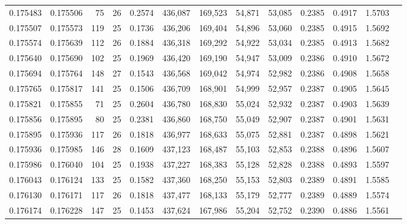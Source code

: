 \begin{tabular}{rrrrrrrrrrrrr}
0.175483 & 0.175506 &  75 &  26 &                                     0.2574 & 436,087 & 169,523 &  54,871 &  53,085 & 0.2385 & 0.4917 & 1.5703 \\
0.175507 & 0.175573 & 119 &  25 &                                     0.1736 & 436,206 & 169,404 &  54,896 &  53,060 & 0.2385 & 0.4915 & 1.5692 \\
0.175574 & 0.175639 & 112 &  26 &                                     0.1884 & 436,318 & 169,292 &  54,922 &  53,034 & 0.2385 & 0.4913 & 1.5682 \\
0.175640 & 0.175690 & 102 &  25 &                                     0.1969 & 436,420 & 169,190 &  54,947 &  53,009 & 0.2386 & 0.4910 & 1.5672 \\
0.175694 & 0.175764 & 148 &  27 &                                     0.1543 & 436,568 & 169,042 &  54,974 &  52,982 & 0.2386 & 0.4908 & 1.5658 \\
0.175765 & 0.175817 & 141 &  25 &                                     0.1506 & 436,709 & 168,901 &  54,999 &  52,957 & 0.2387 & 0.4905 & 1.5645 \\
0.175821 & 0.175855 &  71 &  25 &                                     0.2604 & 436,780 & 168,830 &  55,024 &  52,932 & 0.2387 & 0.4903 & 1.5639 \\
0.175856 & 0.175895 &  80 &  25 &                                     0.2381 & 436,860 & 168,750 &  55,049 &  52,907 & 0.2387 & 0.4901 & 1.5631 \\
0.175895 & 0.175936 & 117 &  26 &                                     0.1818 & 436,977 & 168,633 &  55,075 &  52,881 & 0.2387 & 0.4898 & 1.5621 \\
0.175936 & 0.175985 & 146 &  28 &                                     0.1609 & 437,123 & 168,487 &  55,103 &  52,853 & 0.2388 & 0.4896 & 1.5607 \\
0.175986 & 0.176040 & 104 &  25 &                                     0.1938 & 437,227 & 168,383 &  55,128 &  52,828 & 0.2388 & 0.4893 & 1.5597 \\
0.176043 & 0.176124 & 133 &  25 &                                     0.1582 & 437,360 & 168,250 &  55,153 &  52,803 & 0.2389 & 0.4891 & 1.5585 \\
0.176130 & 0.176171 & 117 &  26 &                                     0.1818 & 437,477 & 168,133 &  55,179 &  52,777 & 0.2389 & 0.4889 & 1.5574 \\
0.176174 & 0.176228 & 147 &  25 &                                     0.1453 & 437,624 & 167,986 &  55,204 &  52,752 & 0.2390 & 0.4886 & 1.5561 \\

\end{tabular}
